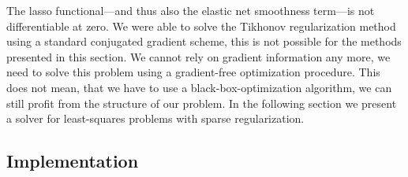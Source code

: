 The lasso functional---and thus also the elastic net smoothness term---is not differentiable at zero.
We were able to solve the Tikhonov regularization method using a standard conjugated gradient scheme, this is not possible for the methods presented in this section.
We cannot rely on gradient information any more, we need to solve this problem using a gradient-free optimization procedure.
This does not mean, that we have to use a black-box-optimization algorithm, we can still profit from the structure of our problem.
In the following section we present a solver for least-squares problems with
sparse regularization.



\subsection{Implementation}


